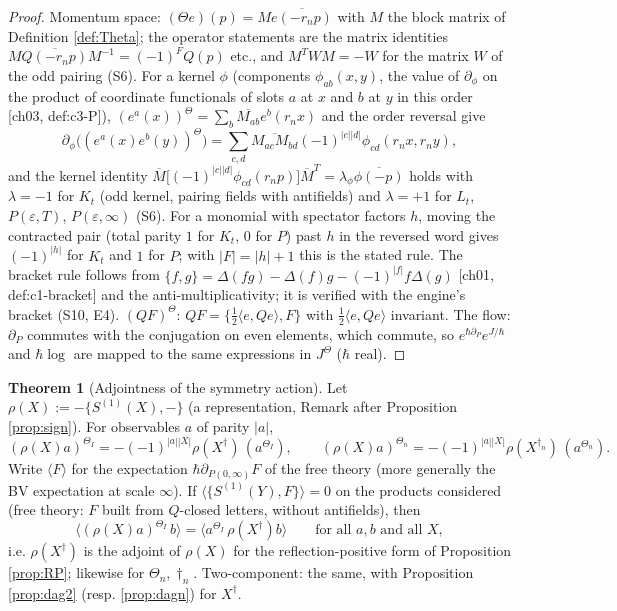 \documentclass[11pt]{article}
\theoremstyle{definition}
\newtheorem{theorem}[definition]{Theorem}
\begin{document}
\begin{proof}
Momentum space: $(\Theta e)(p)=M\overline{e(-r_np)}$ with $M$ the block matrix of Definition \ref{def:Theta}; the operator statements are the matrix identities $M\overline{Q(-r_np)}M^{-1}=(-1)^FQ(p)$ etc., and $M^TWM=-W$ for the matrix $W$ of the odd pairing (S6). For a kernel $\phi$ (components $\phi_{ab}(x,y)$, the value of $\partial_\phi$ on the product of coordinate functionals of slots $a$ at $x$ and $b$ at $y$ in this order [ch03, def:c3-P]), $(e^a(x))^\Theta=\sum_b\overline{M_{ab}}e^b(r_nx)$ and the order reversal give
\[
\partial_\phi\big((e^a(x)e^b(y))^\Theta\big)=\sum_{c,d}\overline{M_{ac}M_{bd}}(-1)^{|c||d|}\phi_{cd}(r_nx,r_ny),
\]
and the kernel identity $\overline M\big[(-1)^{|c||d|}\phi_{cd}(r_np)\big]\overline M^T=\lambda_\phi\overline{\phi(-p)}$ holds with $\lambda=-1$ for $K_t$ (odd kernel, pairing fields with antifields) and $\lambda=+1$ for $L_t$, $P(\varepsilon,T)$, $P(\varepsilon,\infty)$ (S6). For a monomial with spectator factors $h$, moving the contracted pair (total parity $1$ for $K_t$, $0$ for $P$) past $h$ in the reversed word gives $(-1)^{|h|}$ for $K_t$ and $1$ for $P$; with $|F|=|h|+1$ this is the stated rule. The bracket rule follows from $\{f,g\}=\Delta(fg)-\Delta(f)g-(-1)^{|f|}f\Delta(g)$ [ch01, def:c1-bracket] and the anti-multiplicativity; it is verified with the engine's bracket (S10, E4). $(QF)^\Theta$: $QF=\{\frac12\langle e,Qe\rangle,F\}$ with $\frac12\langle e,Qe\rangle$ invariant. The flow: $\partial_P$ commutes with the conjugation on even elements, which commute, so $e^{\hbar\partial_P}e^{J/\hbar}$ and $\hbar\log$ are mapped to the same expressions in $J^\Theta$ ($\hbar$ real).
\end{proof}

\begin{theorem}[Adjointness of the symmetry action]
\label{thm:adjoint}
Let $\rho(X):=-\{S^{(1)}(X),-\}$ (a representation, Remark after Proposition \ref{prop:sign}). For observables $a$ of parity $|a|$,
\[
(\rho(X)a)^{\Theta_I}=-(-1)^{|a||X|}\rho(X^\dagger)\,(a^{\Theta_I}),\qquad (\rho(X)a)^{\Theta_n}=-(-1)^{|a||X|}\rho(X^{\dagger_n})\,(a^{\Theta_n}).
\]
Write $\langle F\rangle$ for the expectation $\hbar\partial_{P(0,\infty)}F$ of the free theory (more generally the BV expectation at scale $\infty$). If $\langle\{S^{(1)}(Y),F\}\rangle=0$ on the products considered (free theory: $F$ built from $Q$-closed letters, without antifields), then
\[
\langle(\rho(X)a)^{\Theta_I}\,b\rangle=\langle a^{\Theta_I}\,\rho(X^\dagger)b\rangle\qquad\text{for all }a,b\text{ and all }X,
\]
i.e. $\rho(X^\dagger)$ is the adjoint of $\rho(X)$ for the reflection-positive form of Proposition \ref{prop:RP}; likewise for $\Theta_n,\dagger_n$. Two-component: the same, with Proposition \ref{prop:dag2} (resp. \ref{prop:dagn}) for $X^\dagger$.
\end{theorem}
\end{document}
